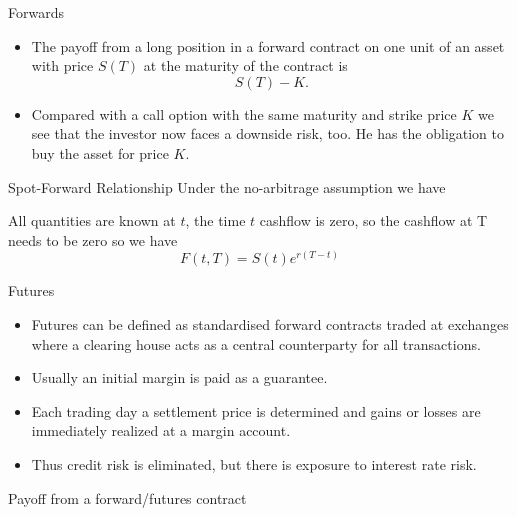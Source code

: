 {Forwards}
\begin{itemize}
\item<1->
The payoff from a long position in a forward contract on one unit
of an asset with price $S(T)$ at the maturity of the contract is
$$ S(T)-K.$$
\item<2-> Compared with a call option with the same maturity
and strike price $K$ we see that the investor now faces a downside
risk, too. He has the obligation to buy the asset for price $K$.
\end{itemize}



{Spot-Forward Relationship}
Under the no-arbitrage assumption we have

\begin{center}
\end{center}

All quantities are known at $t$, the time $t$ cashflow is zero, so the cashflow at T needs to be zero so we have $$F(t,T) = S(t)e^{r(T-t)}$$





{Futures}
\begin{itemize}
\item<1-> Futures can be defined as standardised forward contracts traded at exchanges where a clearing house acts as a central counterparty for all transactions.
\item<2-> Usually an initial margin is paid as a guarantee.
\item<3-> Each trading day a settlement price is determined and gains or losses are immediately realized at a margin account.
\item<4-> Thus credit risk is eliminated, but there is exposure to interest rate risk.

\end{itemize}






{Payoff from a forward/futures contract}
\begin{figure}
  \centering
   \qquad
\end{figure}



